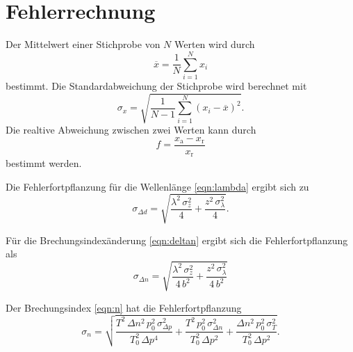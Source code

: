 \section{Fehlerrechnung}

Der Mittelwert einer Stichprobe von $N$ Werten wird durch
\begin{equation}
    \overline{x} = \frac{1}{N} \sum_{i=1}^N x_i
    \label{eqn:mittelwert}
\end{equation}
bestimmt.
\newline
Die Standardabweichung der Stichprobe wird berechnet mit
\begin{equation*}
    \sigma_x = \sqrt{\frac{1}{N-1} \sum_{i=1}^N (x_i - \overline{x})^2}.
    \label{eqn:standard}
\end{equation*}
\newline
Die realtive Abweichung zwischen zwei Werten kann durch
\begin{equation*}
    f = \frac{x_\text{a} - x_\text{r}}{x_\text{r}}
\end{equation*}
bestimmt werden.
\newline

\noindent Die Fehlerfortpflanzung für die Wellenlänge \eqref{eqn:lambda} ergibt sich zu 
\begin{equation}
    \sigma_{\Delta d} = \sqrt{\frac{\lambda^{2} \, \sigma_{z}^{2}}{4} + \frac{z^{2} \, \sigma_{\lambda}^{2}}{4}}.
    \label{eqn:errlambda}
\end{equation}

\noindent Für die Brechungsindexänderung \eqref{eqn:deltan} ergibt sich die Fehlerfortpflanzung als 
\begin{equation}
    \sigma_{\Delta n} =\sqrt{\frac{\lambda^{2} \, \sigma_{z}^{2}}{4 \, b^{2}} + \frac{z^{2} \, \sigma_{\lambda}^{2}}{4 \, b^{2}}}
    \label{eqn:errdeltan}
\end{equation}

\noindent Der Brechungsindex \eqref{eqn:n} hat die Fehlerfortpflanzung 
\begin{equation}
    \sigma_{n} =  \sqrt{\frac{T^{2} \, \Delta n^{2} \, p_{0}^{2} \, \sigma_{\Delta p}^{2}}{T_{0}^{2} \, \Delta p^{4}} + \frac{T^{2} \, p_{0}^{2} \, \sigma_{\Delta n}^{2}}{T_{0}^{2} \, \Delta p^{2}} + \frac{\Delta n^{2} \, p_{0}^{2} \, \sigma_{T}^{2}}{T_{0}^{2} \, \Delta p^{2}}}.
\label{eqn:errn}
\end{equation}
